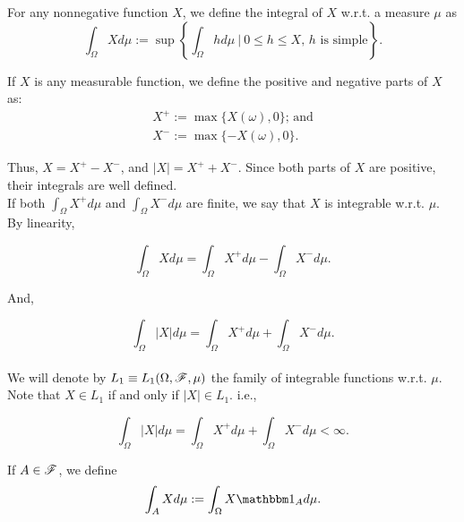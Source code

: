 \documentclass[../TGMAFFIRO.tex]{subfiles}
\begin{document}
\begin{definition}
	For any nonnegative function $X$, we define the integral of $X$ w.r.t. a measure $\mu$ as
	\begin{equation}\label{def:lebesgue_integral}
		\int_\Omega Xd\mu := \sup\left\{\int_\Omega h d\mu \ | \ 0 \leq h \leq X \text{, $h$ is simple}\right\}.
	\end{equation}
\end{definition}

If $X$ is any measurable function, we define the positive and negative parts of $X$ as:
\begin{align}
	X^+ := \max\{X(\omega), 0\} \text{; and}\\
	X^- := \max\{-X(\omega), 0\}.
\end{align}

Thus, $X = X^+ - X^-$, and $|X| = X^+ + X^-$. Since both parts of $X$ are positive, their integrals are well defined.\\

If both $\int_\Omega X^+ d\mu$ and $\int_\Omega X^- d\mu$ are finite, we say that $X$ is integrable w.r.t. $\mu$. By linearity, 

\begin{equation}
	\int_\Omega X d\mu = \int_\Omega X^+ d\mu - \int_\Omega X^- d\mu.
\end{equation}

And,

\begin{equation}
	\int_\Omega |X| d\mu = \int_\Omega X^+ d\mu + \int_\Omega X^- d\mu.
\end{equation} \\

We will denote by $L_1 \equiv L_1(\Omega, \mathscr{F}, \mu)$ the family of integrable functions w.r.t. $\mu$. Note that $X \in L_1$ if and only if $|X| \in L_1$. i.e.,

\begin{equation}
	\int_\Omega |X| d\mu = \int_\Omega X^+ d\mu + \int_\Omega X^- d\mu < \infty.
\end{equation}

If $A \in \mathscr{F}$, we define
\begin{equation}
	\int_A X d\mu := \int_\Omega X \ind_A d\mu.
\end{equation}
\end{document}
